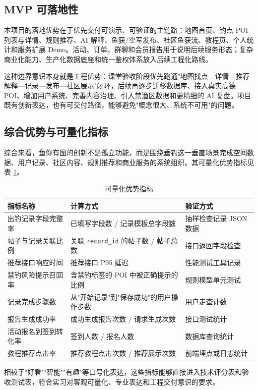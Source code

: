 \subsection{MVP 可落地性}

本项目的落地优势在于优先交付可演示、可验证的主链路：地图首页、钓点 POI 列表与详情、规则推荐、AI 解释、鱼获/空军发布、社区鱼获流、教程页、个人统计和服务扩展 Demo。活动、订单、群聊和会员报告用于说明后续服务形态；复杂商业化能力、生产化数据底座和统一鉴权体系放入后续工程化路线。

这种边界意识本身就是工程优势：课堂验收阶段优先跑通"地图找点—详情—推荐解释—记录—发布—社区展示"闭环，后续再逐步迁移数据库、接入真实高德 POI、增加用户系统、完善内容治理、引入禁渔区数据和更精细的 AI 复盘。项目既有创新表达，也有可交付路径，能够避免"概念很大、系统不可用"的问题。

\subsection{综合优势与可量化指标}

综合来看，鱼你有图的创新不是孤立功能，而是围绕垂钓这一垂直场景完成空间数据、用户记录、社区内容、规则推荐和商业服务的系统组织。其可量化优势指标见表 \ref{tab:quantifiable-metrics}。

\begin{table}[htbp]
  \centering\small
  \caption{可量化优势指标}
  \label{tab:quantifiable-metrics}
  \begin{tabularx}{\textwidth}{>{\raggedright\arraybackslash}p{3.5cm}|>{\raggedright\arraybackslash}p{3.5cm}|X}
    \toprule
    \textbf{指标名称} & \textbf{计算方式} & \textbf{验证方式} \\
    \midrule
    出钓记录字段完整率 & 已填写字段数 / 记录模板总字段数 & 抽样检查记录 JSON 数据 \\
    \hline
    帖子与记录关联比例 & 关联 \texttt{record\_id} 的帖子数 / 帖子总数 & 接口返回字段检查 \\
    \hline
    推荐接口响应时间 & 推荐接口 P95 延迟 & 性能测试工具记录 \\
    \hline
    禁钓风险提示召回率 & 含禁钓标签的 POI 中被正确提示的比例 & 规则模型单元测试 \\
    \hline
    记录完成步骤数 & 从"开始记录"到"保存成功"的用户操作步数 & 用户走查计数 \\
    \hline
    报告生成成功率 & 成功生成报告次数 / 请求生成次数 & 接口测试统计 \\
    \hline
    活动报名到签到转化率 & 签到人数 / 报名人数 & 数据库查询统计 \\
    \hline
    教程推荐点击率 & 推荐教程点击次数 / 推荐展示次数 & 前端埋点或日志统计 \\
    \bottomrule
  \end{tabularx}
\end{table}

相较于"好看""智能""有趣"等口号化表达，这些指标能够直接进入技术评分表和验收测试表，符合实习对客观可量化、专业表达和工程交付意识的要求。
